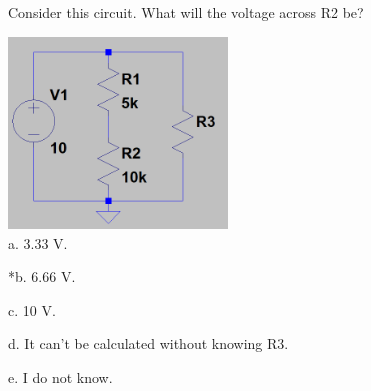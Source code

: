 
Consider this circuit. What will the voltage across R2 be?

\includegraphics[width=2.29288in,height=2.00521in]{../../Images/KirchhoffsLawsQ6.png}\\

a. 3.33 V.

*b. 6.66 V.

c. 10 V.

d. It can't be calculated without knowing R3.

e. I do not know.\\
